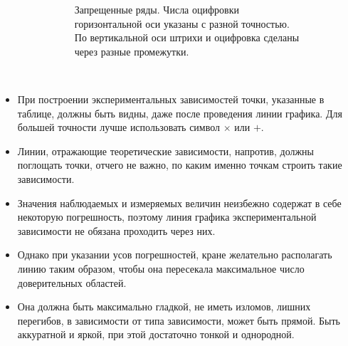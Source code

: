 \begin{itemize}
\begin{figure}
\begin{subfigure}[t]{0.46\tw}
        \caption{Запрещенные ряды. Числа оцифровки горизонтальной оси указаны с разной точностью. По вертикальной оси штрихи и оцифровка сделаны через разные промежутки.}  
    \end{subfigure}
    \hfill\!\!\!~
    \caption{}
\end{figure}    
    
    \item При построении экспериментальных зависимостей точки, указанные в таблице, должны быть видны, даже после проведения линии графика. Для большей точности лучше использовать символ $\times$ или $+$.
    
    \item Линии, отражающие теоретические зависимости, напротив, должны поглощать точки, отчего не важно, по каким именно точкам строить такие зависимости.
    
    \item Значения наблюдаемых и измеряемых величин неизбежно содержат в себе некоторую погрешность, поэтому линия графика экспериментальной зависимости не обязана проходить через них. 

    \item Однако при указании усов погрешностей, кране желательно располагать линию таким образом, чтобы она пересекала максимальное число доверительных областей.
    
    \item Она должна быть максимально гладкой, не иметь изломов, лишних перегибов, в зависимости от типа зависимости, может быть прямой. Быть аккуратной и яркой, при этой достаточно тонкой и однородной.
    
    
    
\end{itemize}








